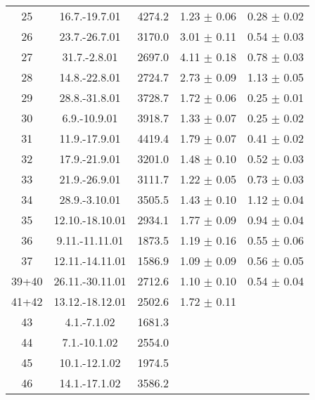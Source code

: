 \documentclass[a4paper,12pt]{article}
\begin{document}
\begin{center}
\begin{longtable}{|c|c|c|c|c|}
    25  &       16.7.-19.7.01   &       4274.2  &       1.23 $\pm$ 0.06 &       0.28 $\pm$ 0.02 \\
    26  &       23.7.-26.7.01   &       3170.0  &       3.01 $\pm$ 0.11 &       0.54 $\pm$ 0.03 \\
    27  &       31.7.-2.8.01    &       2697.0  &       4.11 $\pm$ 0.18 &       0.78 $\pm$ 0.03 \\
    28  &       14.8.-22.8.01   &       2724.7  &       2.73 $\pm$ 0.09 &       1.13 $\pm$ 0.05 \\
    29  &       28.8.-31.8.01   &       3728.7  &       1.72 $\pm$ 0.06 &       0.25 $\pm$ 0.01 \\
    30  &       6.9.-10.9.01    &       3918.7  &       1.33 $\pm$ 0.07 &       0.25 $\pm$ 0.02 \\
    31  &       11.9.-17.9.01   &       4419.4  &       1.79 $\pm$ 0.07 &       0.41 $\pm$ 0.02 \\
    32  &       17.9.-21.9.01   &       3201.0  &       1.48 $\pm$ 0.10 &       0.52 $\pm$ 0.03 \\
    33  &       21.9.-26.9.01   &       3111.7  &       1.22 $\pm$ 0.05 &       0.73 $\pm$ 0.03 \\
    34  &       28.9.-3.10.01   &       3505.5  &       1.43 $\pm$ 0.10 &       1.12 $\pm$ 0.04 \\
    35  &       12.10.-18.10.01 &       2934.1  &       1.77 $\pm$ 0.09 &       0.94 $\pm$ 0.04 \\
    36  &       9.11.-11.11.01  &       1873.5  &       1.19 $\pm$ 0.16 &       0.55 $\pm$ 0.06 \\
    37  &       12.11.-14.11.01 &       1586.9  &       1.09 $\pm$ 0.09 &       0.56 $\pm$ 0.05 \\
    39+40  &    26.11.-30.11.01 &       2712.6  &       1.10 $\pm$ 0.10 &       0.54 $\pm$ 0.04 \\
    41+42  &    13.12.-18.12.01 &       2502.6  &       1.72 $\pm$ 0.11 &                       \\
    43  &       4.1.-7.1.02     &       1681.3  &                       &                       \\
    44  &       7.1.-10.1.02    &       2554.0  &                       &                       \\
    45  &       10.1.-12.1.02   &       1974.5  &                       &                       \\
    46  &       14.1.-17.1.02   &       3586.2  &                       &                       \\

\end{longtable}
\end{center}
\end{document}
